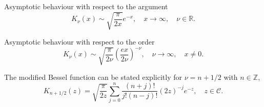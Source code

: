 \documentclass[10pt,a4paper,oneside]{article}
\numberwithin{equation}{section}
\begin{document}
Asymptotic behaviour with respect to the argument
\begin{equation}\label{besselk_x_to_inf}
K_{\nu}(x) \sim \sqrt{\frac{\pi}{2x}} e^{-x}, \quad x \to \infty, \quad \nu \in \mathbb{R}.
\end{equation}

Asymptotic behaviour with respect to the order
\begin{equation}\label{besselk_order_to_inf}
K_{\nu}(x) \sim \sqrt{\frac{\pi}{2\nu}}\left(\frac{ex}{2\nu}\right)^{-\nu}, \quad \nu \to \infty, \quad x \neq 0.
\end{equation}

The modified Bessel function can be stated explicitly for $\nu = n + 1/2$ with $n \in \mathbb{Z}$,
\begin{equation}\label{besselk_half}
K_{n + 1/2}(z) = \sqrt{\frac{\pi}{2z}} \sum_{j=0}^n \frac{(n + j)!}{j! (n-j)!} (2z)^{-j}e^{-z}, \quad z\in \mathcal{C}.
\end{equation}

%
%
%
%
%
%
%



\end{document}
